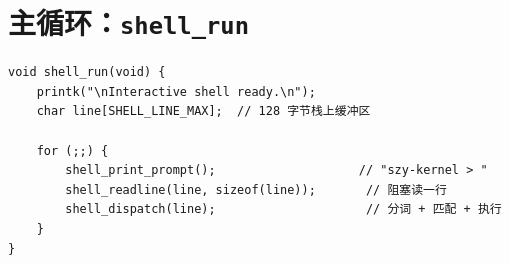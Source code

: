 \section{主循环：\texttt{shell\_run}}

\begin{lstlisting}[style=cstyle]
void shell_run(void) {
    printk("\nInteractive shell ready.\n");
    char line[SHELL_LINE_MAX];  // 128 字节栈上缓冲区

    for (;;) {
        shell_print_prompt();                    // "szy-kernel > "
        shell_readline(line, sizeof(line));       // 阻塞读一行
        shell_dispatch(line);                     // 分词 + 匹配 + 执行
    }
}
\end{lstlisting}


